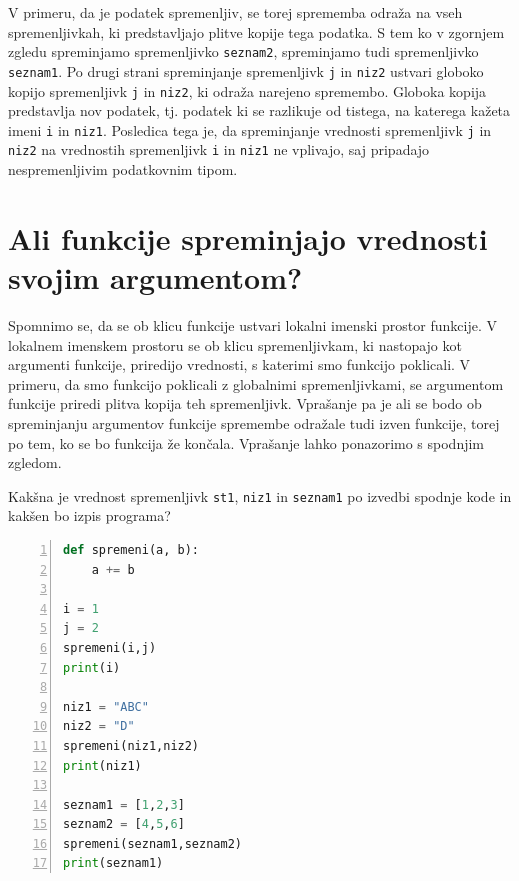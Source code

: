 V primeru, da je podatek spremenljiv, se torej sprememba odraža na vseh spremenljivkah, ki predstavljajo plitve kopije tega podatka. S tem ko v zgornjem zgledu spreminjamo spremenljivko \texttt{seznam2}, spreminjamo tudi spremenljivko \texttt{seznam1}. Po drugi strani spreminjanje spremenljivk \texttt{j} in \texttt{niz2} ustvari globoko kopijo spremenljivk \texttt{j} in \texttt{niz2}, ki odraža narejeno spremembo. Globoka kopija predstavlja nov podatek, tj. podatek ki se razlikuje od tistega, na katerega kažeta imeni \texttt{i} in \texttt{niz1}. Posledica tega je, da spreminjanje vrednosti spremenljivk \texttt{j} in \texttt{niz2} na vrednostih spremenljivk \texttt{i} in \texttt{niz1} ne vplivajo, saj pripadajo nespremenljivim podatkovnim tipom.

\section{Ali funkcije spreminjajo vrednosti svojim argumentom?}
Spomnimo se, da se ob klicu funkcije ustvari lokalni imenski prostor funkcije. V lokalnem imenskem prostoru se ob klicu spremenljivkam, ki nastopajo kot argumenti funkcije, priredijo vrednosti, s katerimi smo funkcijo poklicali. V primeru, da smo funkcijo poklicali z globalnimi spremenljivkami, se argumentom funkcije priredi plitva kopija teh spremenljivk. Vprašanje pa je ali se bodo ob spreminjanju argumentov funkcije spremembe odražale tudi izven funkcije, torej po tem, ko se bo funkcija že končala. Vprašanje lahko ponazorimo s spodnjim zgledom.

\begin{zgled}
Kakšna je vrednost spremenljivk \texttt{st1}, \texttt{niz1} in \texttt{seznam1} po izvedbi spodnje kode in kakšen bo izpis programa?
\begin{lstlisting}[language=Python,numbers=left]
def spremeni(a, b):
    a += b

i = 1
j = 2
spremeni(i,j)
print(i)

niz1 = "ABC"
niz2 = "D"
spremeni(niz1,niz2)
print(niz1)

seznam1 = [1,2,3]
seznam2 = [4,5,6]
spremeni(seznam1,seznam2)
print(seznam1)
\end{lstlisting}
\end{zgled}

